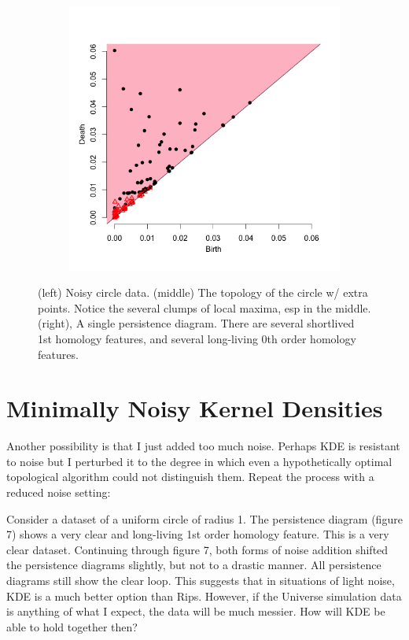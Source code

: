 \documentclass[a4paper]{article}
\begin{document}
\begin{figure}[htp!]
\begin{subfigure}{.32\textwidth}
  \includegraphics[width=\linewidth]{noisycircle2b}
\end{subfigure}
\caption{(left) Noisy circle data. (middle) The topology of the circle w/ extra points. Notice the several clumps of local maxima, esp in the middle. (right), A single persistence diagram. There are several shortlived 1st homology features,  and several long-living 0th order homology features. }
\end{figure}

\section{Minimally Noisy Kernel Densities}
Another possibility is that I just added too much noise. Perhaps KDE is resistant to noise but I perturbed it to the degree in which even a hypothetically optimal topological algorithm could not distinguish them. Repeat the process with a reduced noise setting: 

Consider a dataset of a uniform circle of radius 1. The persistence diagram (figure 7) shows a very clear and long-living 1st order homology feature. This is a very clear dataset. Continuing through figure 7, both forms of noise addition shifted the persistence diagrams slightly, but not to a drastic manner. All persistence diagrams still show the clear loop. This suggests that in situations of light noise, KDE is a much better option than Rips. However, if the Universe simulation data is anything of what I expect, the data will be much messier. How will KDE be able to hold together then? 
\end{document}
